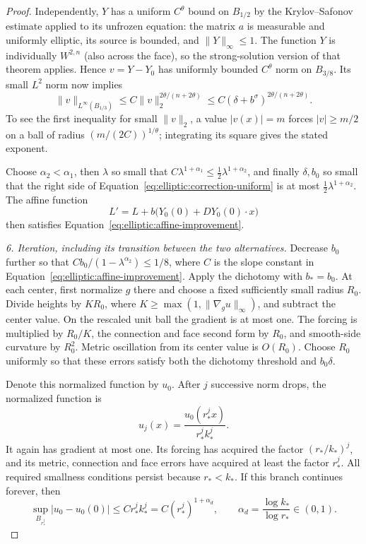 \begin{proof}
Independently, $Y$ has a uniform $C^\theta$ bound on $B_{1/2}$ by the
Krylov--Safonov estimate applied to its unfrozen equation: the matrix
$a$ is measurable and uniformly elliptic, its source is bounded, and
$\|Y\|_\infty\leq1$.  The function $Y$ is individually $W^{2,n}$
(also across the face), so the strong-solution version of that theorem
applies.  Hence $v=Y-Y_0$ has uniformly bounded $C^\theta$ norm on
$B_{3/8}$.  Its small $L^2$ norm now implies
\begin{equation}
 \|v\|_{L^\infty(B_{1/3})}
  \leq C\|v\|_2^{2\theta/(n+2\theta)}
  \leq C(\delta+b^\sigma)^{2\theta/(n+2\theta)}.
 \label{eq:elliptic:correction-uniform}
\end{equation}
To see the first inequality for small $\|v\|_2$, a value $|v(x)|=m$
forces $|v|\geq m/2$ on a ball of radius $(m/(2C))^{1/\theta}$;
integrating its square gives the stated exponent.

Choose $\alpha_2<\alpha_1$, then $\lambda$ so small that
$C\lambda^{1+\alpha_1}\leq\tfrac12\lambda^{1+\alpha_2}$, and finally
$\delta,b_0$ so small that the right side of
Equation~\eqref{eq:elliptic:correction-uniform} is at most
$\tfrac12\lambda^{1+\alpha_2}$.  The affine function
\[
 L'=L+b\bigl(Y_0(0)+DY_0(0)\cdot x\bigr)
\]
then satisfies Equation~\eqref{eq:elliptic:affine-improvement}.

\medskip\noindent
\emph{6. Iteration, including its transition between the two alternatives.}
Decrease $b_0$ further so that
$Cb_0/(1-\lambda^{\alpha_2})\leq1/8$, where $C$ is the slope constant
in Equation~\eqref{eq:elliptic:affine-improvement}.  Apply the dichotomy
with $b_*=b_0$.  At each center, first normalize $g$ there and choose a
fixed sufficiently small radius $R_0$.  Divide heights by $K R_0$, where
$K\geq\max(1,\|\nabla_g u\|_\infty)$, and subtract the center value.
On the rescaled unit ball the gradient is at most one.  The forcing is
multiplied by $R_0/K$, the connection and face second form by $R_0$,
and smooth-side curvature by $R_0^2$.  Metric oscillation from its center
value is $O(R_0)$.  Choose $R_0$ uniformly so that these errors satisfy
both the dichotomy threshold and $b_0\delta$.

Denote this normalized function by $u_0$.  After $j$ successive norm
drops, the normalized function is
\[
 u_j(x)=\frac{u_0(r_*^j x)}{r_*^j k_*^j}.
\]
It again has gradient at most one.  Its forcing has acquired the factor
$(r_*/k_*)^j$, and its metric, connection and face errors have acquired
at least the factor $r_*^j$.  All required smallness conditions persist
because $r_*<k_*$.  If this branch continues forever, then
\[
 \sup_{B_{r_*^j}}|u_0-u_0(0)|
       \leq C r_*^j k_*^j
       =C(r_*^j)^{1+\alpha_d},
 \qquad\alpha_d=\frac{\log k_*}{\log r_*}\in(0,1).
\]


\end{proof}
